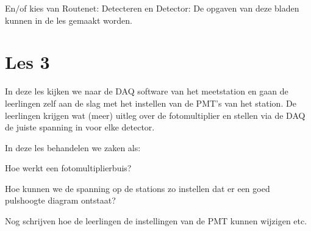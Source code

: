 En$/$of kies van Routenet: 
Detecteren en Detector:
De opgaven van deze bladen kunnen in de les gemaakt worden.

\section{Les 3}
In deze les kijken we naar de DAQ software van het meetstation en gaan de leerlingen 
zelf aan de slag met het instellen van de PMT's van het station.
De leerlingen krijgen wat (meer) uitleg over de fotomultiplier en stellen via de DAQ
de juiste spanning in voor elke detector.


In deze les behandelen we zaken als:
\begin{description}
    \item{Hoe werkt een fotomultiplierbuis?}
    \item{Hoe kunnen we de spanning op de stations zo instellen dat er een 
    goed pulshoogte diagram ontstaat?}
\end{description}

Nog schrijven hoe de leerlingen de instellingen van de PMT kunnen wijzigen etc.


